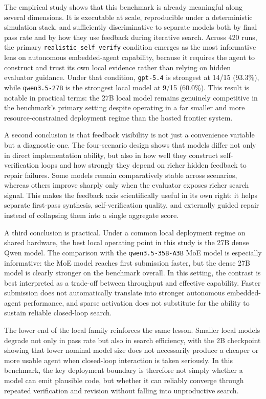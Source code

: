 \documentclass[a4paper,fleqn]{cas-dc}
\DeclareRobustCommand{\tool}[1]{\texttt{\nolinkurl{#1}}}
\begin{document}
The empirical study shows that this benchmark is already meaningful along several dimensions. It is executable at scale, reproducible under a deterministic simulation stack, and sufficiently discriminative to separate models both by final pass rate and by how they use feedback during iterative search. Across 420 runs, the primary \tool{realistic_self_verify} condition emerges as the most informative lens on autonomous embedded-agent capability, because it requires the agent to construct and trust its own local evidence rather than relying on hidden evaluator guidance. Under that condition, \tool{gpt-5.4} is strongest at 14/15 (93.3\%), while \tool{qwen3.5-27B} is the strongest local model at 9/15 (60.0\%). This result is notable in practical terms: the 27B local model remains genuinely competitive in the benchmark's primary setting despite operating in a far smaller and more resource-constrained deployment regime than the hosted frontier system.

A second conclusion is that feedback visibility is not just a convenience variable but a diagnostic one. The four-scenario design shows that models differ not only in direct implementation ability, but also in how well they construct self-verification loops and how strongly they depend on richer hidden feedback to repair failures. Some models remain comparatively stable across scenarios, whereas others improve sharply only when the evaluator exposes richer search signal. This makes the feedback axis scientifically useful in its own right: it helps separate first-pass synthesis, self-verification quality, and externally guided repair instead of collapsing them into a single aggregate score.

A third conclusion is practical. Under a common local deployment regime on shared hardware, the best local operating point in this study is the 27B dense Qwen model. The comparison with the \tool{qwen3.5-35B-A3B} MoE model is especially informative: the MoE model reaches first submission faster, but the dense 27B model is clearly stronger on the benchmark overall. In this setting, the contrast is best interpreted as a trade-off between throughput and effective capability. Faster submission does not automatically translate into stronger autonomous embedded-agent performance, and sparse activation does not substitute for the ability to sustain reliable closed-loop search.

The lower end of the local family reinforces the same lesson. Smaller local models degrade not only in pass rate but also in search efficiency, with the 2B checkpoint showing that lower nominal model size does not necessarily produce a cheaper or more usable agent when closed-loop interaction is taken seriously. In this benchmark, the key deployment boundary is therefore not simply whether a model can emit plausible code, but whether it can reliably converge through repeated verification and revision without falling into unproductive search.
\end{document}
